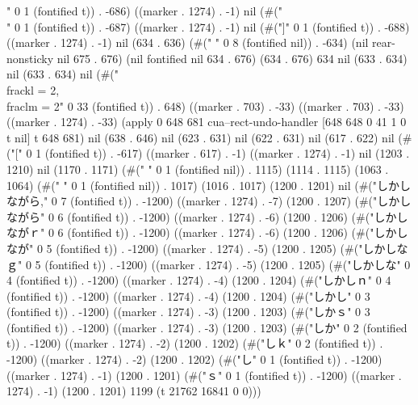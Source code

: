 " 0 1 (fontified t)) . -686) ((marker . 1274) . -1) nil (#("\\" 0 1 (fontified t)) . -687) ((marker . 1274) . -1) nil (#("]" 0 1 (fontified t)) . -688) ((marker . 1274) . -1) nil (634 . 636) (#("        " 0 8 (fontified nil)) . -634) (nil rear-nonsticky nil 675 . 676) (nil fontified nil 634 . 676) (634 . 676) 634 nil (633 . 634) nil (633 . 634) nil (#("	\\frac{k}{l} = 2, \\frac{l}{m} = 2" 0 33 (fontified t)) . 648) ((marker . 703) . -33) ((marker . 703) . -33) ((marker . 1274) . -33) (apply 0 648 681 cua--rect-undo-handler [648 648 0 41 1 0 t nil] t 648 681) nil (638 . 646) nil (623 . 631) nil (622 . 631) nil (617 . 622) nil (#("[" 0 1 (fontified t)) . -617) ((marker . 617) . -1) ((marker . 1274) . -1) nil (1203 . 1210) nil (1170 . 1171) (#(" " 0 1 (fontified nil)) . 1115) (1114 . 1115) (1063 . 1064) (#(" " 0 1 (fontified nil)) . 1017) (1016 . 1017) (1200 . 1201) nil (#("しかしながら," 0 7 (fontified t)) . -1200) ((marker . 1274) . -7) (1200 . 1207) (#("しかしながら" 0 6 (fontified t)) . -1200) ((marker . 1274) . -6) (1200 . 1206) (#("しかしながｒ" 0 6 (fontified t)) . -1200) ((marker . 1274) . -6) (1200 . 1206) (#("しかしなが" 0 5 (fontified t)) . -1200) ((marker . 1274) . -5) (1200 . 1205) (#("しかしなｇ" 0 5 (fontified t)) . -1200) ((marker . 1274) . -5) (1200 . 1205) (#("しかしな" 0 4 (fontified t)) . -1200) ((marker . 1274) . -4) (1200 . 1204) (#("しかしｎ" 0 4 (fontified t)) . -1200) ((marker . 1274) . -4) (1200 . 1204) (#("しかし" 0 3 (fontified t)) . -1200) ((marker . 1274) . -3) (1200 . 1203) (#("しかｓ" 0 3 (fontified t)) . -1200) ((marker . 1274) . -3) (1200 . 1203) (#("しか" 0 2 (fontified t)) . -1200) ((marker . 1274) . -2) (1200 . 1202) (#("しｋ" 0 2 (fontified t)) . -1200) ((marker . 1274) . -2) (1200 . 1202) (#("し" 0 1 (fontified t)) . -1200) ((marker . 1274) . -1) (1200 . 1201) (#("ｓ" 0 1 (fontified t)) . -1200) ((marker . 1274) . -1) (1200 . 1201) 1199 (t 21762 16841 0 0)))
